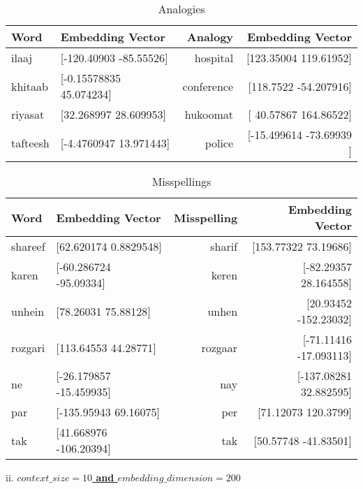 \documentclass{exam}
\begin{document}
\begin{table}[h!]
  			\begin{center}
    			\caption{Analogies}
    			\begin{tabular}{l|l|r|r}
      				\textbf{Word} & \textbf{Embedding Vector} & \textbf{Analogy} & \textbf{Embedding Vector}\\
      				\hline
      				ilaaj & [-120.40903  -85.55526] & hospital & [123.35004 119.61952]\\
      				khitaab & [-0.15578835 45.074234] & conference & [118.7522   -54.207916]\\
      				riyasat & [32.268997 28.609953] & hukoomat & [ 40.57867 164.86522]\\
      				tafteesh & [-4.4760947 13.971443] & police & [-15.499614 -73.69939 ]\\
    			\end{tabular}
  			\end{center}
\end{table}


\begin{table}[h!]
  			\begin{center}
    			\caption{Misspellings}
    			\begin{tabular}{l|l|r|r}
      				\textbf{Word} & \textbf{Embedding Vector} & \textbf{Misspelling} & \textbf{Embedding Vector}\\
      				\hline
      				shareef & [62.620174   0.8829548] & sharif & [153.77322  73.19686]\\
      				karen & [-60.286724 -95.09334] & keren & [-82.29357   28.164558]\\
      				unhein & [78.26031 75.88128] & unhen & [20.93452 -152.23032]\\
      				rozgari & [113.64553  44.28771] & rozgaar & [-71.11416  -17.093113]\\
      				ne & [-26.179857 -15.459935] & nay & [-137.08281    32.882595]\\
      				par & [-135.95943   69.16075] & per & [71.12073 120.3799]\\
     				tak & [41.668976 -106.20394] & tak & [50.57748 -41.83501]\\
    			\end{tabular}
  			\end{center}
\end{table}
\pagebreak

ii. \underline{\textbf{$context\_size = 10$ and $embedding\_dimension = 200$}}\\
\end{document}
